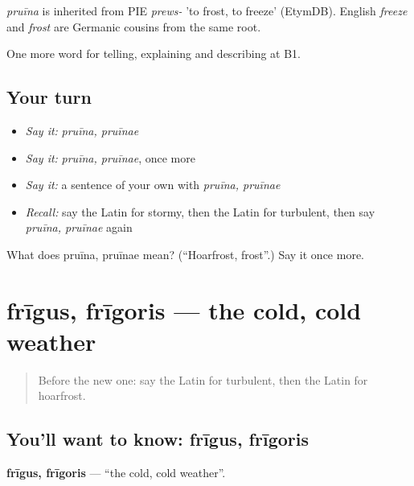 \begin{cousinweb}
\emph{pruīna} is inherited from PIE \emph{prews-} 'to frost, to freeze' (EtymDB). English \emph{freeze} and \emph{frost} are Germanic cousins from the same root.
\end{cousinweb}

\begin{grammarlens}[title={What you've built}]
One more word for telling, explaining and describing at B1.
\end{grammarlens}

\subsection*{Your turn}
\begin{itemize}
\raggedright
  \item \emph{Say it:} \emph{pruīna, pruīnae}
  \item \emph{Say it:} \emph{pruīna, pruīnae}, once more
  \item \emph{Say it:} a sentence of your own with \emph{pruīna, pruīnae}
  \item \emph{Recall:} say the Latin for stormy, then the Latin for turbulent, then say \emph{pruīna, pruīnae} again
\end{itemize}

\begin{tcolorbox}[breakable,colback=teal!4,colframe=teal!35!black,title={Before you move on}]
What does pruīna, pruīnae mean? (\textquotedblleft{}Hoarfrost, frost\textquotedblright{}.) Say it once more.
\end{tcolorbox}
\section[frīgus, frīgoris]{frīgus, frīgoris — the cold, cold weather}

\label{lesson:LA-C486-frigus}



\begin{quote}
Before the new one: say the Latin for turbulent, then the Latin for hoarfrost.
\end{quote}

\subsection*{You'll want to know: frīgus, frīgoris}
\textbf{frīgus, frīgoris} — \textquotedblleft{}the cold, cold weather\textquotedblright{}.

